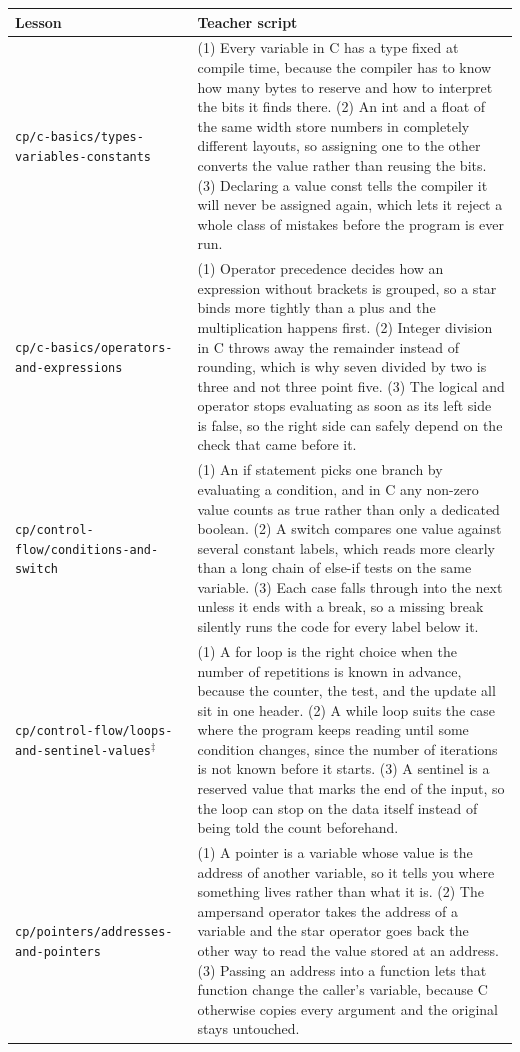 \documentclass[pdflatex,sn-mathphys-num]{sn-jnl}%
\theoremstyle{thmstyleone}%
\theoremstyle{thmstyletwo}%
\theoremstyle{thmstylethree}%
\begin{document}
\begin{appendices}
\footnotesize
\begin{longtable}{p{}p{}}
\toprule
Lesson & Teacher script \\
\midrule
\endhead
\texttt{cp/c-basics/types-variables-constants} & (1) Every variable in C has a type fixed at compile time, because the compiler has to know how many bytes to reserve and how to interpret the bits it finds there. (2) An int and a float of the same width store numbers in completely different layouts, so assigning one to the other converts the value rather than reusing the bits. (3) Declaring a value const tells the compiler it will never be assigned again, which lets it reject a whole class of mistakes before the program is ever run. \\ \midrule
\texttt{cp/c-basics/operators-and-expressions} & (1) Operator precedence decides how an expression without brackets is grouped, so a star binds more tightly than a plus and the multiplication happens first. (2) Integer division in C throws away the remainder instead of rounding, which is why seven divided by two is three and not three point five. (3) The logical and operator stops evaluating as soon as its left side is false, so the right side can safely depend on the check that came before it. \\ \midrule
\texttt{cp/control-flow/conditions-and-switch} & (1) An if statement picks one branch by evaluating a condition, and in C any non-zero value counts as true rather than only a dedicated boolean. (2) A switch compares one value against several constant labels, which reads more clearly than a long chain of else-if tests on the same variable. (3) Each case falls through into the next unless it ends with a break, so a missing break silently runs the code for every label below it. \\ \midrule
\texttt{cp/control-flow/loops-and-sentinel-values}$^{\ddagger}$ & (1) A for loop is the right choice when the number of repetitions is known in advance, because the counter, the test, and the update all sit in one header. (2) A while loop suits the case where the program keeps reading until some condition changes, since the number of iterations is not known before it starts. (3) A sentinel is a reserved value that marks the end of the input, so the loop can stop on the data itself instead of being told the count beforehand. \\ \midrule
\texttt{cp/pointers/addresses-and-pointers} & (1) A pointer is a variable whose value is the address of another variable, so it tells you where something lives rather than what it is. (2) The ampersand operator takes the address of a variable and the star operator goes back the other way to read the value stored at an address. (3) Passing an address into a function lets that function change the caller's variable, because C otherwise copies every argument and the original stays untouched. \\ \midrule

\end{longtable}
\end{appendices}
\end{document}
